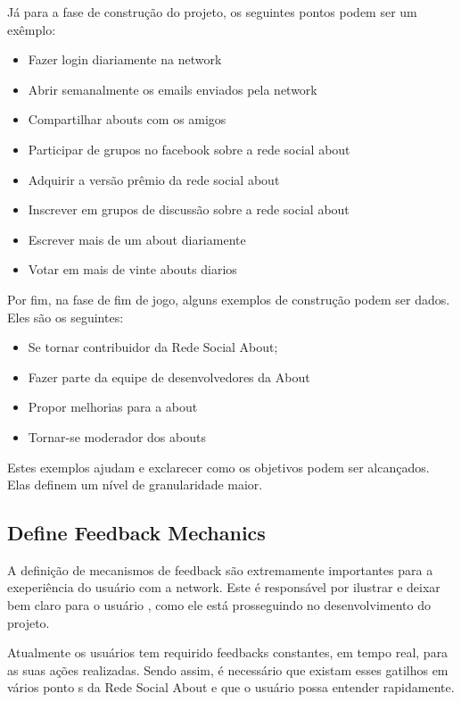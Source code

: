 Já para a fase de construção do projeto, os seguintes pontos podem ser um
exêmplo:

\begin{itemize}
    \item Fazer login diariamente na network
    \item Abrir semanalmente os emails enviados pela network
    \item Compartilhar abouts com os amigos
    \item Participar de grupos no facebook sobre a rede social about
    \item Adquirir a versão prêmio da rede social about
    \item Inscrever em grupos de discussão sobre a rede social about
    \item Escrever mais de um about diariamente
    \item Votar em mais de vinte abouts diarios
\end{itemize}

Por fim, na fase de fim de jogo, alguns exemplos de construção podem ser dados. 
Eles são os seguintes:
\begin{itemize}
    \item Se tornar contribuidor da Rede Social About;
    \item Fazer parte da equipe de desenvolvedores da About
    \item Propor melhorias para a about
    \item Tornar-se moderador dos abouts
\end{itemize}

Estes exemplos ajudam e exclarecer como os objetivos podem ser alcançados. Elas 
definem um nível de
granularidade maior.

\subsection{Define Feedback Mechanics}
\label{sub:define_feedback_mechanics}
A definição de mecanismos de feedback são extremamente importantes para a exeperiência do usuário
com a network. Este é responsável por ilustrar e deixar bem claro para o usuário
, como ele está
prosseguindo no desenvolvimento do projeto.

Atualmente os usuários tem requirido feedbacks constantes, em tempo real, para as suas ações
realizadas. Sendo assim, é necessário que existam esses gatilhos em vários ponto
s da
Rede Social About e que o usuário possa entender rapidamente.

